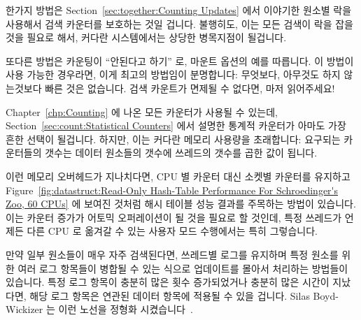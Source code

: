 한가지 방법은
Section~\ref{sec:together:Counting Updates}
에서 이야기한 원소별 락을 사용해서 검색 카운터를 보호하는 것일 겁니다.
불행히도, 이는 모든 검색이 락을 잡을 것을 필요로 해서, 커다란 시스템에서는
상당한 병목지점이 될겁니다.

또다른 방법은 카운팅이 ``안된다고 하기'' 로,  마운트 옵션의 예를
따릅니다.
이 방법이 사용 가능한 경우라면, 이게 최고의 방법임이 분명합니다: 무엇보다,
아무것도 하지 않는것보다 빠른 것은 없습니다.
검색 카운트가 면제될 수 없다면, 마저 읽어주세요!
\iffalse

Suppose that Schr\"odinger also wants to count the number of lookups for
each animal, where lookups are protected by RCU.
How can this counting best be done?

One approach would be to protect a lookup counter with the per-element
lock, as discussed in
Section~\ref{sec:together:Counting Updates}.
Unfortunately, this would require all lookups to acquire this lock,
which would be a severe bottleneck on large systems.

Another approach is to ``just say no'' to counting, following the example
of the \co{noatime} mount option.
If this approach is feasible, it is clearly the best:  After all, nothing
is faster than doing nothing.
If the lookup count cannot be dispensed with, read on!
\fi

Chapter~\ref{chp:Counting} 에 나온 모든 카운터가 사용될 수 있는데,
Section~\ref{sec:count:Statistical Counters}
에서 설명한 통계적 카운터가 아마도 가장 흔한 선택이 될겁니다.
하지만, 이는 커다란 메모리 사용량을 초래합니다: 요구되는 카운터들의 갯수는
데이터 원소들의 갯수에 쓰레드의 갯수를 곱한 값이 됩니다.

이런 메모리 오버헤드가 지나치다면, CPU 별 카운터 대신 소켓별 카운터를 유지하고
Figure~\ref{fig:datastruct:Read-Only Hash-Table Performance For Schroedinger's Zoo, 60 CPUs}
에 보여진 것처럼 해시 테이블 성능 결과를 주목하는 방법이 있습니다.
이는 카운터 증가가 어토믹 오퍼레이션이 될 것을 필요로 할 것인데, 특정 쓰레드가
언제든 다른 CPU 로 옮겨갈 수 있는 사용자 모드 수행에서는 특히 그렇습니다.

만약 일부 원소들이 매우 자주 검색된다면, 쓰레드별 로그를 유지하며 특정 원소를
위한 여러 로그 항목들이 병합될 수 있는 식으로 업데이트를 몰아서 처리하는
방법들이 있습니다.
특정 로그 항목이 충분히 많은 횟수 증가되었거나 충분히 많은 시간이 지났다면,
해당 로그 항목은 연관된 데이터 항목에 적용될 수 있을 겁니다.
Silas Boyd-Wickizer 는 이런 노선을 정형화
시켰습니다~\cite{SilasBoydWickizerPhD}.
\iffalse


